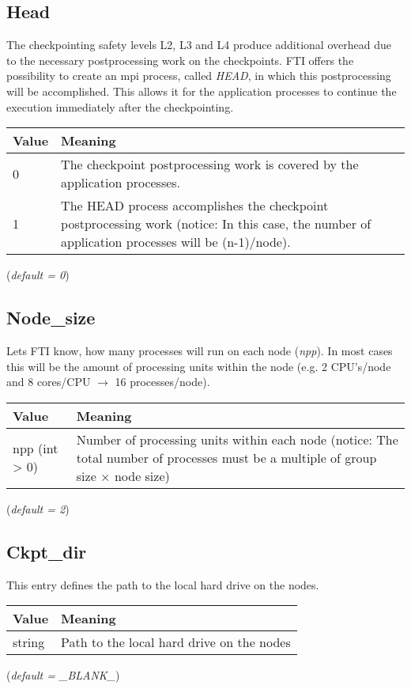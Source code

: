 \documentclass{refrep}
\begin{document}
\subsection{Head}\label{subsec:head}
The checkpointing safety levels L2, L3 and L4 produce additional overhead due to the necessary postprocessing work on the checkpoints. FTI offers the possibility to create an mpi process, called \emph{HEAD}, in which this postprocessing will be accomplished. This allows it for the application processes to continue the execution immediately after the checkpointing.
\begin{center}
\begin{tabular}[h!]{|p{}|p{}|}
\hline
\textbf{Value} & \textbf{Meaning} \\ \hline
0 & The checkpoint postprocessing work is covered by the application processes. \\ \hline
1 & The HEAD process accomplishes the checkpoint postprocessing work (notice: In this case, the number of application processes will be (n-1)/node). \\
\hline
\end{tabular}
\end{center}
(\textit{default = 0})
\subsection{Node\_size}\label{subsec:nodesize}
Lets FTI know, how many processes will run on each node (\emph{npp}). In most cases this will be the amount of processing units within the node (e.g. 2 CPU's/node and 8 cores/CPU $\rightarrow$ 16 processes/node).
\begin{center}
\begin{tabular}[h!]{|p{}|p{}|}
\hline
\textbf{Value} & \textbf{Meaning} \\ \hline
npp (int > 0) & Number of processing units within each node (notice: The total number of processes must be a multiple of group size $\times$ node size) \\ \hline
\end{tabular}
\end{center}
(\textit{default = 2})
\subsection{Ckpt\_dir}\label{subsec:ckptdir}
This entry defines the path to the local hard drive on the nodes.
\begin{center}
\begin{tabular}[h!]{|p{}|p{}|}
\hline
\textbf{Value} & \textbf{Meaning} \\ \hline
string & Path to the local hard drive on the nodes \\ \hline
\end{tabular}
\end{center}
(\textit{default = \_BLANK\_})
\end{document}
